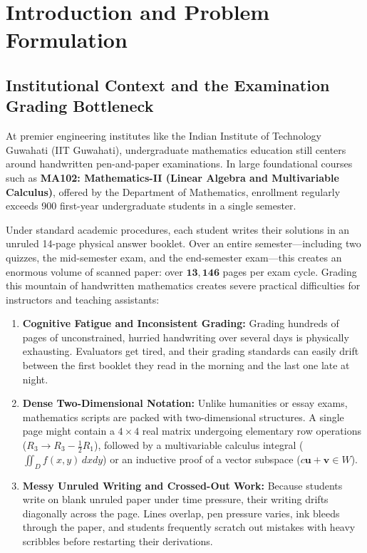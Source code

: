 \chapter{Introduction and Problem Formulation}
\label{ch:introduction}

\section{Institutional Context and the Examination Grading Bottleneck}
\label{sec:institutional_context}

At premier engineering institutes like the Indian Institute of Technology Guwahati (IIT Guwahati), undergraduate mathematics education still centers around handwritten pen-and-paper examinations. In large foundational courses such as \textbf{MA102: Mathematics-II (Linear Algebra and Multivariable Calculus)}, offered by the Department of Mathematics, enrollment regularly exceeds 900 first-year undergraduate students in a single semester.

Under standard academic procedures, each student writes their solutions in an unruled 14-page physical answer booklet. Over an entire semester---including two quizzes, the mid-semester exam, and the end-semester exam---this creates an enormous volume of scanned paper: over $\mathbf{13,146}$ pages per exam cycle. Grading this mountain of handwritten mathematics creates severe practical difficulties for instructors and teaching assistants:
\begin{enumerate}
    \item \textbf{Cognitive Fatigue and Inconsistent Grading:} Grading hundreds of pages of unconstrained, hurried handwriting over several days is physically exhausting. Evaluators get tired, and their grading standards can easily drift between the first booklet they read in the morning and the last one late at night.
    \item \textbf{Dense Two-Dimensional Notation:} Unlike humanities or essay exams, mathematics scripts are packed with two-dimensional structures. A single page might contain a $4 \times 4$ real matrix undergoing elementary row operations ($R_3 \to R_3 - \frac{1}{2} R_1$), followed by a multivariable calculus integral ($\iint_D f(x, y) \, dx dy$) or an inductive proof of a vector subspace ($c\mathbf{u} + \mathbf{v} \in W$).
    \item \textbf{Messy Unruled Writing and Crossed-Out Work:} Because students write on blank unruled paper under time pressure, their writing drifts diagonally across the page. Lines overlap, pen pressure varies, ink bleeds through the paper, and students frequently scratch out mistakes with heavy scribbles before restarting their derivations.
\end{enumerate}

